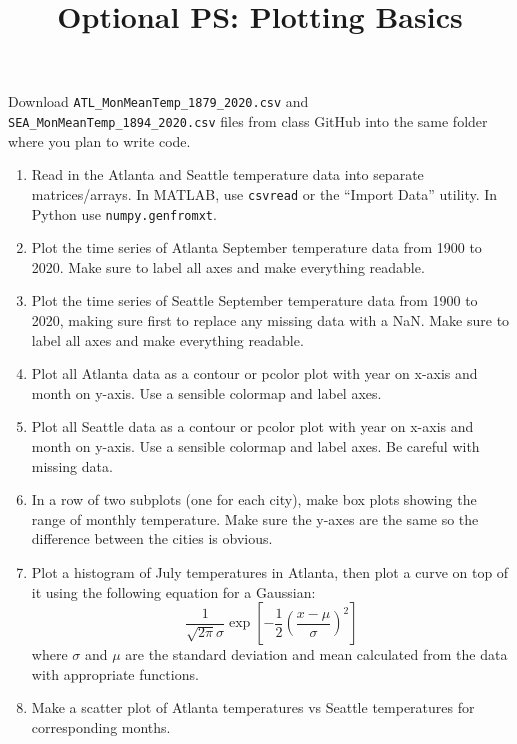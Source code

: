 \documentclass{article}
\title{\vspace{-1in} Optional PS: Plotting Basics}
\newcommand{\be}{\begin{enumerate}}
\newcommand{\ee}{\end{enumerate}}
\begin{document}
\maketitle

Download \texttt{ATL\_MonMeanTemp\_1879\_2020.csv} and \texttt{SEA\_MonMeanTemp\_1894\_2020.csv} files from class GitHub into the same folder where you plan to write code.

\be
\item Read in the Atlanta and Seattle temperature data into separate matrices/arrays. In MATLAB, use \texttt{csvread} or the ``Import Data'' utility. In Python use \texttt{numpy.genfromxt}.

\item Plot the time series of Atlanta September temperature data from 1900 to 2020. Make sure to label all axes and make everything readable.

\item Plot the time series of Seattle September temperature data from 1900 to 2020, making sure first to replace any missing data with a NaN. Make sure to label all axes and make everything readable. 

\item Plot all Atlanta data as a contour or pcolor plot with year on x-axis and month on y-axis. Use a sensible colormap and label axes.

\item Plot all Seattle data as a contour or pcolor plot with year on x-axis and month on y-axis. Use a sensible colormap and label axes. Be careful with missing data.

\item In a row of two subplots (one for each city), make box plots showing the range of monthly temperature. Make sure the y-axes are the same so the difference between the cities is obvious.

\item Plot a histogram of July temperatures in Atlanta, then plot a curve on top of it using the following equation for a Gaussian:
\begin{equation}
\frac{1}{\sqrt{2 \pi} \sigma} \exp \left[-\frac{1}{2} \left(\frac{x-\mu}{\sigma} \right)^2 \right]
\end{equation}
where $\sigma$ and $\mu$ are the standard deviation and mean calculated from the data with appropriate functions.

\item Make a scatter plot of Atlanta temperatures vs Seattle temperatures for corresponding months.

\ee
\end{document}
